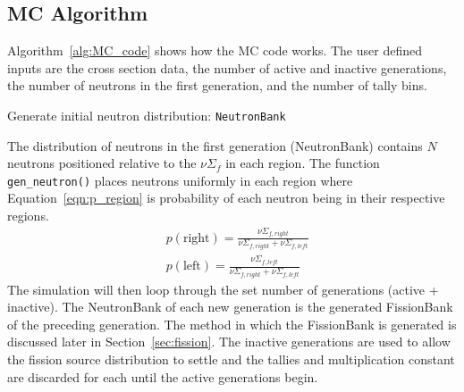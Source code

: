 \documentclass[letterpaper]{article}
\begin{document}
\subsection{MC Algorithm}
Algorithm~\ref{alg:MC_code} shows how the MC code works. The user defined inputs are the cross section data, the number of active and inactive generations, the number of neutrons in the first generation, and the number of tally bins. 

\begin{algorithm}
  \DontPrintSemicolon
  Generate initial neutron distribution: \texttt{NeutronBank}\;
  \caption{Pseudocode for Monte Carlo algorithm.}
  \label{alg:MC_code}
\end{algorithm}

The distribution of neutrons in the first generation (NeutronBank) contains $N$ neutrons positioned relative to the $\nu\Sigma_f$ in each region. The function \texttt{gen\_neutron()} places neutrons uniformly in each region where Equation~\ref{eqn:p_region} is probability of each neutron being in their respective regions.
\begin{equation}
\begin{split}
    & p(\text{right}) = \frac{\nu\Sigma_{f,right}}{\nu\Sigma_{f,right}+\nu\Sigma_{f,left}} \\
    & p(\text{left}) = \frac{\nu\Sigma_{f,left}}{\nu\Sigma_{f,right}+\nu\Sigma_{f,left}} 
\end{split}
\label{eqn:p_region}
\end{equation}
The simulation will then loop through the set number of generations (active + inactive). The NeutronBank of each new generation is the generated FissionBank of the preceding generation. The method in which the FissionBank is generated is discussed later in Section~\ref{sec:fission}. The inactive generations are used to allow the fission source distribution to settle and the tallies and multiplication constant are discarded for each until the active generations begin.
\end{document}
